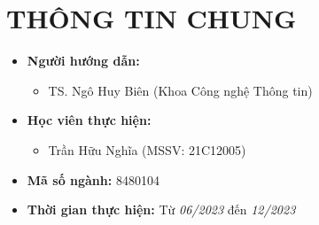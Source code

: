 \documentclass{article}[14pt]
\begin{document}
    \vspace{.5cm}
    
    \Large
    \section{THÔNG TIN CHUNG}
    \begin{itemize}[label = {}]
        
        \item \textbf{Người hướng dẫn:} 
        \begin{itemize}
            \item TS. Ngô Huy Biên (Khoa Công nghệ Thông tin)
        \end{itemize}{}
    
        
        \item \textbf{Học viên thực hiện:}
        
        \begin{itemize}
        
            \item Trần Hữu Nghĩa (MSSV: 21C12005) 
           
        \end{itemize}

        \item \textbf{Mã số ngành:} 8480104
        
        \item \textbf{Thời gian thực hiện:} Từ \textit{06/2023} đến \textit{12/2023}
        
        
    \end{itemize}
    
    \pagebreak 
    
\end{document}
